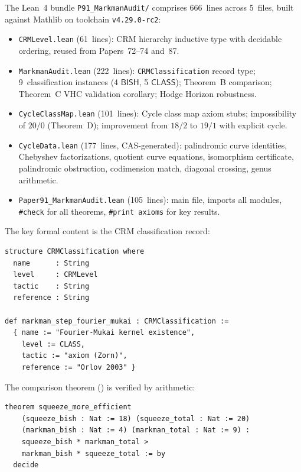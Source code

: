 \documentclass[11pt]{article}
\theoremstyle{plain}
\theoremstyle{definition}
\theoremstyle{remark}
\newcommand{\BISH}{\mathsf{BISH}}
\newcommand{\CLASS}{\mathsf{CLASS}}
\begin{document}
The Lean~4 bundle \texttt{P91\_MarkmanAudit/} comprises
666~lines across 5~files, built against Mathlib on toolchain
\texttt{v4.29.0-rc2}:

\begin{itemize}[nosep]
\item \texttt{CRMLevel.lean} (61~lines): CRM hierarchy inductive
  type with decidable ordering, reused from Papers~72--74 and~87.
\item \texttt{MarkmanAudit.lean} (222~lines): \texttt{CRMClassification}
  record type; 9~classification instances (4 $\BISH$, 5 $\CLASS$);
  Theorem~B comparison; Theorem~C VHC validation corollary; Hodge
  Horizon robustness.
\item \texttt{CycleClassMap.lean} (101~lines): Cycle class map axiom
  stubs; impossibility of $20/0$ (Theorem~D); improvement from $18/2$
  to $19/1$ with explicit cycle.
\item \texttt{CycleData.lean} (177~lines, CAS-generated): palindromic
  curve identities, Chebyshev factorizations, quotient curve
  equations, isomorphism certificate, palindromic obstruction,
  codimension match, diagonal crossing, genus arithmetic.
\item \texttt{Paper91\_MarkmanAudit.lean} (105~lines): main file,
  imports all modules, \texttt{\#check} for all theorems,
  \texttt{\#print axioms} for key results.
\end{itemize}

\noindent
The key formal content is the CRM classification record:

\begin{lstlisting}[style=leanstyle,caption={CRM classification (from MarkmanAudit.lean)}]
structure CRMClassification where
  name      : String
  level     : CRMLevel
  tactic    : String
  reference : String

def markman_step_fourier_mukai : CRMClassification :=
  { name := "Fourier-Mukai kernel existence",
    level := CLASS,
    tactic := "axiom (Zorn)",
    reference := "Orlov 2003" }
\end{lstlisting}

\noindent
The comparison theorem () is verified by arithmetic:

\begin{lstlisting}[style=leanstyle,caption={Theorem B: Squeeze efficiency (from MarkmanAudit.lean)}]
theorem squeeze_more_efficient
    (squeeze_bish : Nat := 18) (squeeze_total : Nat := 20)
    (markman_bish : Nat := 4) (markman_total : Nat := 9) :
    squeeze_bish * markman_total >
    markman_bish * squeeze_total := by
  decide
\end{lstlisting}
\end{document}
